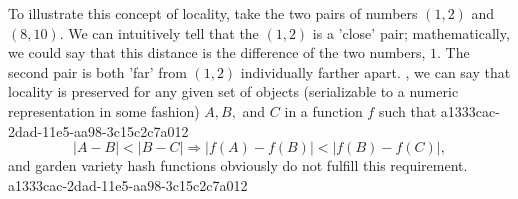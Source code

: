 \documentclass[12pt]{article}
\begin{document}
\par To illustrate this concept of locality, take the two pairs of numbers $(1,2)$ and $(8,10)$. We can intuitively tell that the $(1,2)$ is a 'close' pair; mathematically, we could say that this distance is the difference of the two numbers, $1$. The second pair is both 'far' from $(1,2)$ individually farther apart. , we can say that locality is preserved for any given set of objects (serializable to a numeric representation in some fashion) $A,B,$ and $C$ in a function $f$ such that
a1333cac-2dad-11e5-aa98-3c15c2c7a012\begin{equation}
|A-B| < |B-C| \Rightarrow |f(A)-f(B)| < |f(B) - f(C)|,
\end{equation}
and garden variety hash functions obviously do not fulfill this requirement.
a1333cac-2dad-11e5-aa98-3c15c2c7a012
\printbibliography
\end{document}
